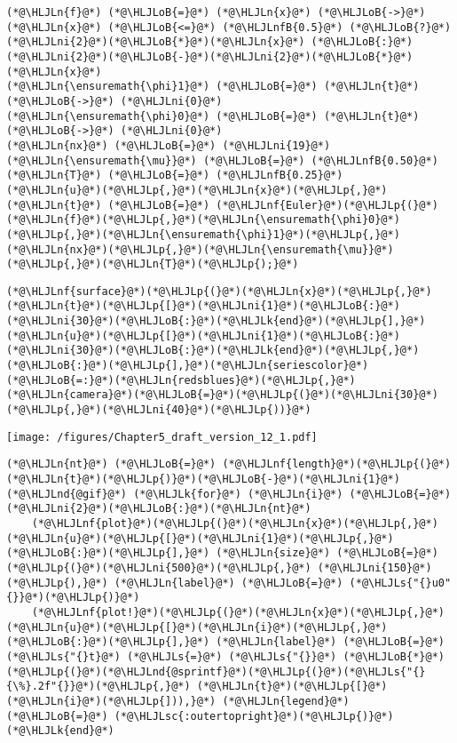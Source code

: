 \documentclass[12pt,a4paper]{article}
\newcommand{\HLJLk}[1]{\textcolor[RGB]{148,91,176}{\textbf{#1}}}
\newcommand{\HLJLn}[1]{#1}
\newcommand{\HLJLnd}[1]{\textcolor[RGB]{214,102,97}{#1}}
\newcommand{\HLJLnf}[1]{\textcolor[RGB]{66,102,213}{#1}}
\newcommand{\HLJLs}[1]{\textcolor[RGB]{201,61,57}{#1}}
\newcommand{\HLJLsc}[1]{\textcolor[RGB]{201,61,57}{#1}}
\newcommand{\HLJLnfB}[1]{\textcolor[RGB]{59,151,46}{#1}}
\newcommand{\HLJLni}[1]{\textcolor[RGB]{59,151,46}{#1}}
\newcommand{\HLJLoB}[1]{\textcolor[RGB]{102,102,102}{\textbf{#1}}}
\newcommand{\HLJLp}[1]{#1}
\begin{document}
\begin{lstlisting}
(*@\HLJLn{f}@*) (*@\HLJLoB{=}@*) (*@\HLJLn{x}@*) (*@\HLJLoB{->}@*) (*@\HLJLn{x}@*) (*@\HLJLoB{<=}@*) (*@\HLJLnfB{0.5}@*) (*@\HLJLoB{?}@*) (*@\HLJLni{2}@*)(*@\HLJLoB{*}@*)(*@\HLJLn{x}@*) (*@\HLJLoB{:}@*) (*@\HLJLni{2}@*)(*@\HLJLoB{-}@*)(*@\HLJLni{2}@*)(*@\HLJLoB{*}@*)(*@\HLJLn{x}@*)
(*@\HLJLn{\ensuremath{\phi}1}@*) (*@\HLJLoB{=}@*) (*@\HLJLn{t}@*) (*@\HLJLoB{->}@*) (*@\HLJLni{0}@*)
(*@\HLJLn{\ensuremath{\phi}0}@*) (*@\HLJLoB{=}@*) (*@\HLJLn{t}@*) (*@\HLJLoB{->}@*) (*@\HLJLni{0}@*)
(*@\HLJLn{nx}@*) (*@\HLJLoB{=}@*) (*@\HLJLni{19}@*)
(*@\HLJLn{\ensuremath{\mu}}@*) (*@\HLJLoB{=}@*) (*@\HLJLnfB{0.50}@*)
(*@\HLJLn{T}@*) (*@\HLJLoB{=}@*) (*@\HLJLnfB{0.25}@*)
(*@\HLJLn{u}@*)(*@\HLJLp{,}@*)(*@\HLJLn{x}@*)(*@\HLJLp{,}@*)(*@\HLJLn{t}@*) (*@\HLJLoB{=}@*) (*@\HLJLnf{Euler}@*)(*@\HLJLp{(}@*)(*@\HLJLn{f}@*)(*@\HLJLp{,}@*)(*@\HLJLn{\ensuremath{\phi}0}@*)(*@\HLJLp{,}@*)(*@\HLJLn{\ensuremath{\phi}1}@*)(*@\HLJLp{,}@*)(*@\HLJLn{nx}@*)(*@\HLJLp{,}@*)(*@\HLJLn{\ensuremath{\mu}}@*)(*@\HLJLp{,}@*)(*@\HLJLn{T}@*)(*@\HLJLp{);}@*)
\end{lstlisting}


\begin{lstlisting}
(*@\HLJLnf{surface}@*)(*@\HLJLp{(}@*)(*@\HLJLn{x}@*)(*@\HLJLp{,}@*)(*@\HLJLn{t}@*)(*@\HLJLp{[}@*)(*@\HLJLni{1}@*)(*@\HLJLoB{:}@*)(*@\HLJLni{30}@*)(*@\HLJLoB{:}@*)(*@\HLJLk{end}@*)(*@\HLJLp{],}@*)(*@\HLJLn{u}@*)(*@\HLJLp{[}@*)(*@\HLJLni{1}@*)(*@\HLJLoB{:}@*)(*@\HLJLni{30}@*)(*@\HLJLoB{:}@*)(*@\HLJLk{end}@*)(*@\HLJLp{,}@*)(*@\HLJLoB{:}@*)(*@\HLJLp{],}@*)(*@\HLJLn{seriescolor}@*)(*@\HLJLoB{=:}@*)(*@\HLJLn{redsblues}@*)(*@\HLJLp{,}@*) (*@\HLJLn{camera}@*)(*@\HLJLoB{=}@*)(*@\HLJLp{(}@*)(*@\HLJLni{30}@*)(*@\HLJLp{,}@*)(*@\HLJLni{40}@*)(*@\HLJLp{))}@*)
\end{lstlisting}

\texttt{[image: /figures/Chapter5\_draft\_version\_12\_1.pdf]}

\begin{lstlisting}
(*@\HLJLn{nt}@*) (*@\HLJLoB{=}@*) (*@\HLJLnf{length}@*)(*@\HLJLp{(}@*)(*@\HLJLn{t}@*)(*@\HLJLp{)}@*)(*@\HLJLoB{-}@*)(*@\HLJLni{1}@*)
(*@\HLJLnd{@gif}@*) (*@\HLJLk{for}@*) (*@\HLJLn{i}@*) (*@\HLJLoB{=}@*) (*@\HLJLni{2}@*)(*@\HLJLoB{:}@*)(*@\HLJLn{nt}@*) 
    (*@\HLJLnf{plot}@*)(*@\HLJLp{(}@*)(*@\HLJLn{x}@*)(*@\HLJLp{,}@*) (*@\HLJLn{u}@*)(*@\HLJLp{[}@*)(*@\HLJLni{1}@*)(*@\HLJLp{,}@*)(*@\HLJLoB{:}@*)(*@\HLJLp{],}@*) (*@\HLJLn{size}@*) (*@\HLJLoB{=}@*) (*@\HLJLp{(}@*)(*@\HLJLni{500}@*)(*@\HLJLp{,}@*) (*@\HLJLni{150}@*)(*@\HLJLp{),}@*) (*@\HLJLn{label}@*) (*@\HLJLoB{=}@*) (*@\HLJLs{"{}u0"{}}@*)(*@\HLJLp{)}@*)
    (*@\HLJLnf{plot!}@*)(*@\HLJLp{(}@*)(*@\HLJLn{x}@*)(*@\HLJLp{,}@*) (*@\HLJLn{u}@*)(*@\HLJLp{[}@*)(*@\HLJLn{i}@*)(*@\HLJLp{,}@*)(*@\HLJLoB{:}@*)(*@\HLJLp{],}@*) (*@\HLJLn{label}@*) (*@\HLJLoB{=}@*) (*@\HLJLs{"{}t}@*) (*@\HLJLs{=}@*) (*@\HLJLs{"{}}@*) (*@\HLJLoB{*}@*) (*@\HLJLp{(}@*)(*@\HLJLnd{@sprintf}@*)(*@\HLJLp{(}@*)(*@\HLJLs{"{}{\%}.2f"{}}@*)(*@\HLJLp{,}@*) (*@\HLJLn{t}@*)(*@\HLJLp{[}@*)(*@\HLJLn{i}@*)(*@\HLJLp{])),}@*) (*@\HLJLn{legend}@*) (*@\HLJLoB{=}@*) (*@\HLJLsc{:outertopright}@*)(*@\HLJLp{)}@*)
(*@\HLJLk{end}@*)
\end{lstlisting}
\end{document}
